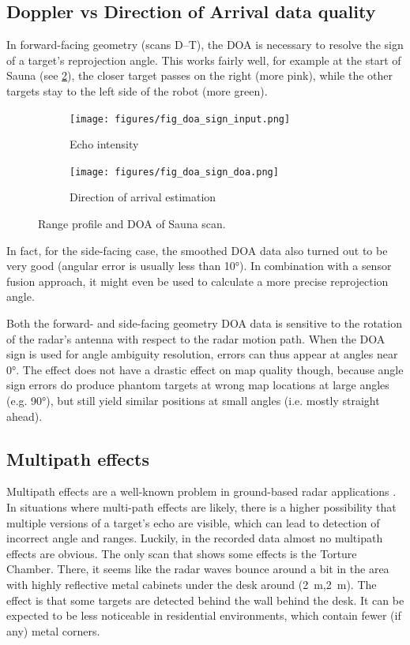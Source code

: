 \subsection{Doppler vs Direction of Arrival data quality} \label{doppler-vs-direction-of-arrival-data-quality}

In forward-facing geometry (scans D--T), the DOA is necessary to resolve
the sign of a target's reprojection angle. This works fairly well, for
example at the start of Sauna (see \cref{fig:sauna_doa}), the closer target
passes on the right (more pink), while the other targets stay to the
left side of the robot (more green).

\begin{figure}[htbp]
    \centering
    \begin{subfigure}[b]{0.45\textwidth}
        \texttt{[image: figures/fig\_doa\_sign\_input.png]}
        \caption{\label{fig:sauna_input}Echo intensity}
    \end{subfigure}%
    \hfill%
    \begin{subfigure}[b]{0.45\textwidth}
        \texttt{[image: figures/fig\_doa\_sign\_doa.png]}
        \caption{\label{fig:sauna_doa}Direction of arrival estimation}
    \end{subfigure}
    \caption{Range profile and DOA of Sauna scan.}
    \label{fig:sauna}
\end{figure}

In fact, for the side-facing case, the smoothed DOA data also turned out
to be very good (angular error is usually less than \ang{10}). In combination with a sensor fusion approach, it might even be used to calculate a more precise
reprojection angle.

Both the forward- and side-facing geometry DOA data is sensitive to the rotation of the radar's antenna with respect to the radar motion path. When the DOA sign is used for angle ambiguity resolution, errors can thus appear at angles near \ang{0}. The effect does not have a drastic effect on map quality though, because angle sign errors do produce phantom targets at wrong map locations at large angles (e.g. \ang{90}), but still yield similar positions at small angles (i.e. mostly straight ahead).

\subsection{Multipath effects}\label{multipath-effects}

Multipath effects are a well-known problem in ground-based radar
applications \cite{Adams2012}. In situations where multi-path effects
are likely, there is a higher possibility that multiple versions of a
target's echo are visible, which can lead to detection of incorrect
angle and ranges. Luckily, in the recorded data almost no multipath
effects are obvious. The only scan that shows some effects is the
Torture Chamber. There, it seems like the radar waves bounce around a
bit in the area with highly reflective metal cabinets under the desk around (\SI{2}{m},\SI{2}{m}). The effect is that some targets are detected behind the wall behind the desk. It can be expected to be less noticeable in residential environments, which contain fewer (if any) metal corners.

